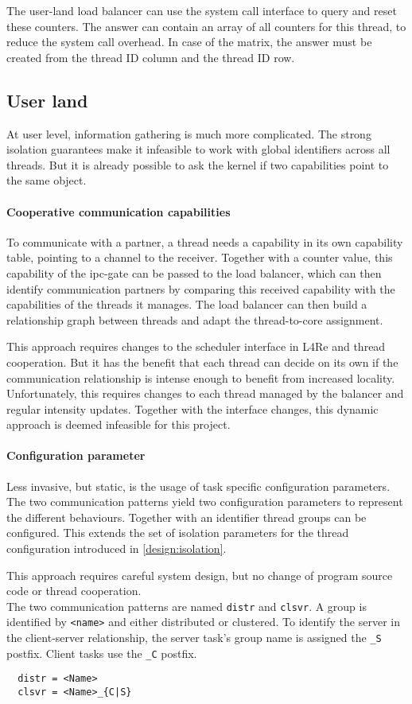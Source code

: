 The user-land load balancer can use the system call interface to query
and reset these counters.
The answer can contain an array of all counters for this thread, to reduce the
system call overhead.
In case of the matrix, the answer must be created from the thread ID column and
the thread ID row.


\subsection{User land}
At user level, information gathering is much more complicated.
The strong isolation guarantees make it infeasible to work with global
identifiers across all threads.
But it is already possible to ask the kernel if two capabilities point to the
same object.

\paragraph{Cooperative communication capabilities}
To communicate with a partner, a thread needs a capability in its own
capability table, pointing to a channel to the receiver.
Together with a counter value, this capability of the \gls{ipc}-gate can be
passed to the load balancer, which can then identify communication partners by
comparing this received capability with the capabilities of the threads
it manages.
The load balancer can then build a relationship graph between threads and adapt
the thread-to-core assignment.

This approach requires changes to the scheduler interface in L4Re and
thread cooperation.
But it has the benefit that each thread can decide on its own if the
communication relationship is intense enough to benefit from increased
locality.
Unfortunately, this requires changes to each thread managed by the balancer and
regular intensity updates.
Together with the interface changes, this dynamic approach is deemed infeasible
for this project.

\paragraph{Configuration parameter}
Less invasive, but static, is the usage of task specific configuration parameters.
The two communication patterns yield two configuration parameters to represent the
different behaviours.
Together with an identifier thread groups can be configured.
This extends the set of isolation parameters for the thread configuration
introduced in \ref{design:isolation}.

This approach requires careful system design, but no change of program source
code or thread cooperation.
\\

The two communication patterns are named \texttt{distr} and \texttt{clsvr}.
A group is identified by \texttt{<name>} and either distributed or clustered.
To identify the server in the client-server relationship, the server task's
group name is assigned the \texttt{\_S} postfix.
Client tasks use the \texttt{\_C} postfix.

\begin{lstlisting}
  distr = <Name>
  clsvr = <Name>_{C|S}
\end{lstlisting}
